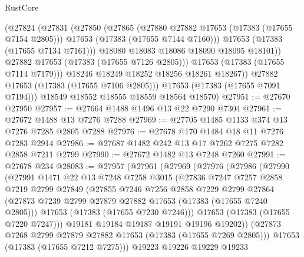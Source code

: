 \begin{lexlean}{RustCore}
\begin{coremodule}
                  (@27824
                    (@27831
                      (@27850
                        (@27865
                          (@27880 @27882 @17653 (@17383 (@17655 @7154 @2805)))
                          @17653
                          (@17383 (@17655 @7144 @7160)))
                        @17653
                        (@17383 (@17655 @7134 @7161)))
                      @18080
                      @18083
                      @18086
                      @18090
                      @18095
                      @18101))
                  @27882
                  @17653
                  (@17383 (@17655 @7126 @2805)))
                @17653
                (@17383 (@17655 @7114 @7179)))
              @18246
              @18249
              @18252
              @18256
              @18261
              @18267))
          @27882
          @17653
          (@17383 (@17655 @7106 @2805)))
        @17653
        (@17383 (@17655 @7091 @7194)))
      @18549
      @18552
      @18555
      @18559
      @18564
      @18570)
@27951 := @27670 @27950
@27957 := @27664 @1488 @1496 @13 @22 @7290 @7304
@27961 := @27672 @1488 @13 @7276 @7288
@27969 := @27705 @1485 @1133 @374 @13 @7276 @7285 @2805 @7288
@27976 := @27678 @170 @1484 @18 @11 @7276 @7283 @2914
@27986 := @27687 @1482 @242 @13 @17 @7262 @7275 @7282 @2858 @7211 @2799
@27990 := @27672 @1482 @13 @7248 @7260
@27991 := @27678 @234
@28083 := @27957
    (@27961
      (@27969
        (@27976
          (@27986
            (@27990
              (@27991
                @1471
                @22
                @13
                @7248
                @7258
                @3015
                (@27836
                  @7247
                  @7257
                  @2858
                  @7219
                  @2799
                  @27849
                  (@27855
                    @7246
                    @7256
                    @2858
                    @7229
                    @2799
                    @27864
                    (@27873 @7239 @2799 @27879 @27882 @17653 (@17383 (@17655 @7240 @2805)))
                    @17653
                    (@17383 (@17655 @7230 @7246)))
                  @17653
                  (@17383 (@17655 @7220 @7247)))
                @19181
                @19184
                @19187
                @19191
                @19196
                @19202))
            (@27873 @7268 @2799 @27879 @27882 @17653 (@17383 (@17655 @7269 @2805)))
            @17653
            (@17383 (@17655 @7212 @7275)))
          @19223
          @19226
          @19229
          @19233

\end{coremodule}
\end{lexlean}
